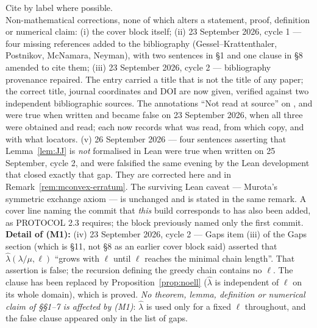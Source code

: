 \documentclass[11pt]{article}
\theoremstyle{plain}
\theoremstyle{definition}
\begin{document}
\begin{center}
{Cite by label where possible.
\\[2pt]
Non-mathematical corrections, none of which alters a statement, proof, definition or numerical
claim:
(i) the cover block itself;
(ii) 23 September 2026, cycle 1 --- four missing references added to the bibliography
(Gessel--Krattenthaler, Postnikov, McNamara, Neyman), with two sentences in \S1 and one clause
in \S8 amended to cite them;
(iii) 23 September 2026, cycle 2 --- bibliography provenance repaired. The entry \cite{Lee2019}
carried a title that is not the title of any paper; the correct title, journal coordinates and
DOI are now given, verified against two independent bibliographic sources. The annotations
``Not read at source'' on \cite{Post}, \cite{GesKra} and \cite{McN} were true when written and
became false on 23 September 2026, when all three were obtained and read; each now records what
was read, from which copy, and with what locators.
(v) 26 September 2026 --- four sentences asserting that Lemma~\ref{lem:JJ} is \emph{not}
formalised in Lean were true when written on 25 September, cycle 2, and were falsified the same
evening by the Lean development that closed exactly that gap. They are corrected here and in
Remark~\ref{rem:mconvex-erratum}. The surviving Lean caveat --- Murota's symmetric exchange
axiom --- is unchanged and is stated in the same remark. A cover line naming the commit that
\emph{this} build corresponds to has also been added, as PROTOCOL 2.3 requires; the block
previously named only the first commit.
\\[2pt]
\textbf{Detail of (M1):} (iv) 23 September 2026, cycle 2 --- Gaps item
(iii) of the Gaps section (which is \S11, not \S8 as an earlier cover block said) asserted that $\hat\lambda(\lambda/\mu,\ell)$ ``grows with $\ell$ until $\ell$
reaches the minimal chain length''. That assertion is false; the recursion defining the
greedy chain contains no $\ell$. The clause has been replaced by
Proposition~\ref{prop:noell} ($\hat\lambda$ is independent of $\ell$ on its whole domain),
which is proved. \emph{No theorem, lemma, definition or numerical claim of \S\S1--7 is
affected by (M1)}: $\hat\lambda$ is used only for a fixed $\ell$ throughout, and the false clause
appeared only in the list of gaps.}
\end{center}
\end{document}
